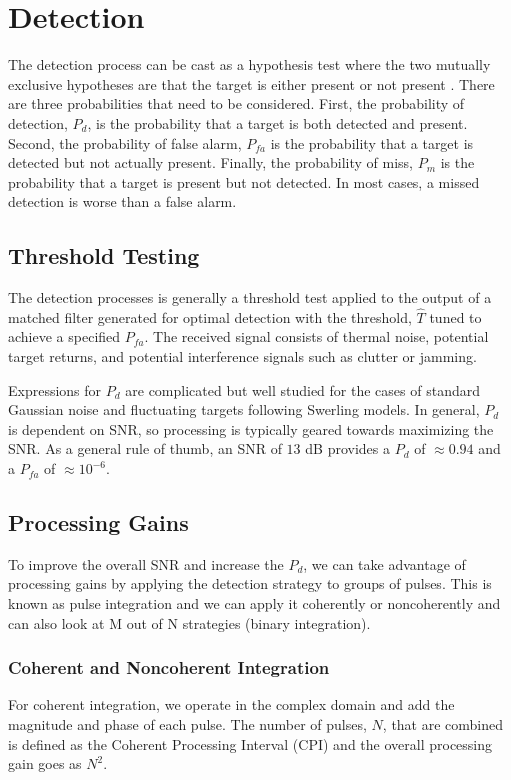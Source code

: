 \section{Detection}
The detection process can be cast as a hypothesis test where the two mutually exclusive hypotheses are that the target is either present or not present \cite{richards_radar}. There are three probabilities that need to be considered. First, the probability of detection, $P_d$, is the probability that a target is both detected and present. Second, the probability of false alarm, $P_{fa}$ is the probability that a target is detected but not actually present. Finally, the probability of miss, $P_m$ is the probability that a target is present but not detected. In most cases, a missed detection is worse than a false alarm.

\subsection{Threshold Testing}
The detection processes is generally a threshold test applied to the output of a matched filter generated for optimal detection with the threshold, $\hat{T}$ tuned to achieve a specified $P_{fa}$. The received signal consists of thermal noise, potential target returns, and potential interference signals such as clutter or jamming.

Expressions for $P_d$ are complicated but well studied for the cases of standard Gaussian noise and fluctuating targets following Swerling models. In general, $P_d$ is dependent on SNR, so processing is typically geared towards maximizing the SNR. As a general rule of thumb, an SNR of $13$ dB provides a $P_d$ of $\approx 0.94$ and a $P_{fa}$ of $\approx 10^{-6}$.

\subsection{Processing Gains}
To improve the overall SNR and increase the $P_d$, we can take advantage of processing gains by applying the detection strategy to groups of pulses. This is known as pulse integration and we can apply it coherently or noncoherently and can also look at M out of N strategies (binary integration).

\subsubsection{Coherent and Noncoherent Integration}
For coherent integration, we operate in the complex domain and add the magnitude and phase of each pulse. The number of pulses, $N$, that are combined is defined as the Coherent Processing Interval (CPI) and the overall processing gain goes as $N^2$.

